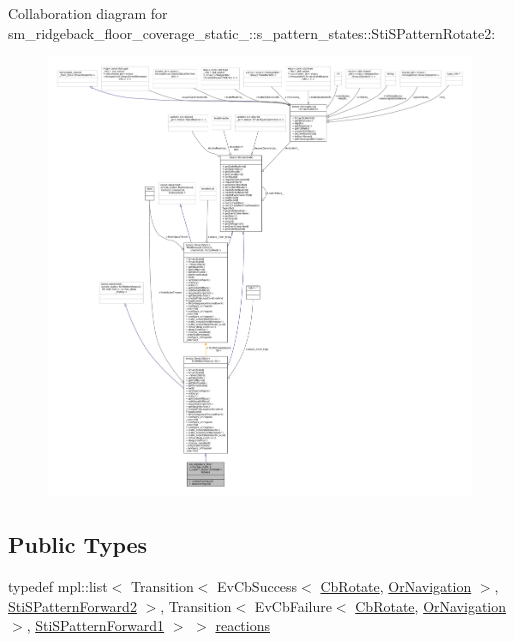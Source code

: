 Collaboration diagram for sm\+\_\+ridgeback\+\_\+floor\+\_\+coverage\+\_\+static\+\_\+:\+:s\+\_\+pattern\+\_\+states\+:\+:Sti\+S\+Pattern\+Rotate2\+:
\nopagebreak
\begin{figure}[H]
\begin{center}
\leavevmode
\includegraphics[width=350pt]{structsm__ridgeback__floor__coverage__static__1_1_1s__pattern__states_1_1StiSPatternRotate2__coll__graph}
\end{center}
\end{figure}
\subsection*{Public Types}
\begin{DoxyCompactItemize}
\item 
typedef mpl\+::list$<$ Transition$<$ Ev\+Cb\+Success$<$ \hyperlink{classcl__move__base__z_1_1CbRotate}{Cb\+Rotate}, \hyperlink{classsm__ridgeback__floor__coverage__static__1_1_1OrNavigation}{Or\+Navigation} $>$, \hyperlink{structsm__ridgeback__floor__coverage__static__1_1_1s__pattern__states_1_1StiSPatternForward2}{Sti\+S\+Pattern\+Forward2} $>$, Transition$<$ Ev\+Cb\+Failure$<$ \hyperlink{classcl__move__base__z_1_1CbRotate}{Cb\+Rotate}, \hyperlink{classsm__ridgeback__floor__coverage__static__1_1_1OrNavigation}{Or\+Navigation} $>$, \hyperlink{structsm__ridgeback__floor__coverage__static__1_1_1s__pattern__states_1_1StiSPatternForward1}{Sti\+S\+Pattern\+Forward1} $>$ $>$ \hyperlink{structsm__ridgeback__floor__coverage__static__1_1_1s__pattern__states_1_1StiSPatternRotate2_a7a279f7fc1f6de39d9e97cd41e0f3f32}{reactions}
\end{DoxyCompactItemize}
